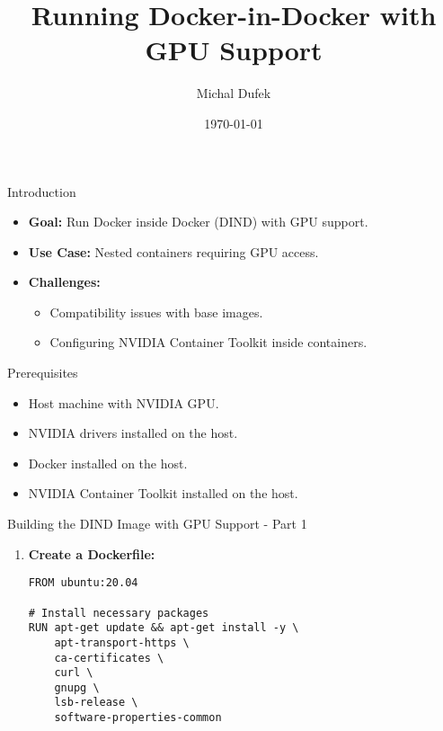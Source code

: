 \documentclass{beamer}
\title{Running Docker-in-Docker with GPU Support}
\author{Michal Dufek}
\date{\today}
\begin{document}
\begin{frame}
    \titlepage
\end{frame}

\begin{frame}{Introduction}
    \begin{itemize}
        \item \textbf{Goal:} Run Docker inside Docker (DIND) with GPU support.
        \item \textbf{Use Case:} Nested containers requiring GPU access.
        \item \textbf{Challenges:}
        \begin{itemize}
            \item Compatibility issues with base images.
            \item Configuring NVIDIA Container Toolkit inside containers.
        \end{itemize}
    \end{itemize}
\end{frame}

\begin{frame}{Prerequisites}
    \begin{itemize}
        \item Host machine with NVIDIA GPU.
        \item NVIDIA drivers installed on the host.
        \item Docker installed on the host.
        \item NVIDIA Container Toolkit installed on the host.
    \end{itemize}
\end{frame}

\begin{frame}[fragile]{Building the DIND Image with GPU Support - Part 1}
    \begin{enumerate}
        \item \textbf{Create a Dockerfile:}
        \tiny %
        \begin{verbatim}
FROM ubuntu:20.04

# Install necessary packages
RUN apt-get update && apt-get install -y \
    apt-transport-https \
    ca-certificates \
    curl \
    gnupg \
    lsb-release \
    software-properties-common
        \end{verbatim}
    \end{enumerate}
\end{frame}
\end{document}
